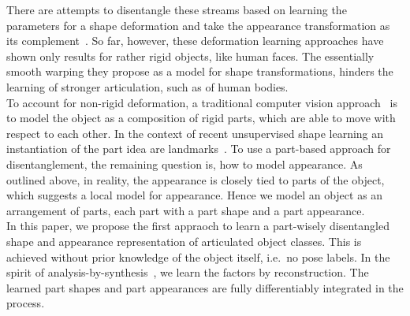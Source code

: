 There are attempts to disentangle these streams based on learning the parameters for a shape deformation and take the appearance transformation as its complement~\cite{Shu:2018ua, Xing:2018un}.
So far, however, these deformation learning approaches have shown only results for rather rigid objects, like human faces. The essentially smooth warping they propose as a model for shape transformations, hinders the learning of stronger articulation, such as of human bodies. \\
To account for non-rigid deformation, a traditional computer vision approach~\cite{Ross:2006uc, Cootes:1998tn} is to model the object as a composition of rigid parts, which are able to move with respect to each other.
In the context of recent unsupervised shape learning an instantiation
of the part idea are landmarks~\cite{Thewlis:2017wi, Zhang:2018vz, Jakab:2018wc}.
To use a part-based approach for disentanglement, the remaining question is, how to model appearance. As outlined above, in reality, the appearance is closely tied to parts of the object, which suggests a local model for appearance. Hence we model an object as an arrangement of parts, each part with a part shape and a part appearance. \\
%
In this paper, we propose the first appraoch to learn a part-wisely disentangled shape and appearance representation of articulated object classes.
This is achieved without prior knowledge of the object itself, i.e.\ no pose labels.
In the spirit of analysis-by-synthesis~\cite{Yildirim:2015ur}, we learn the factors by reconstruction. The learned part shapes and part appearances are fully differentiably integrated in the process.
